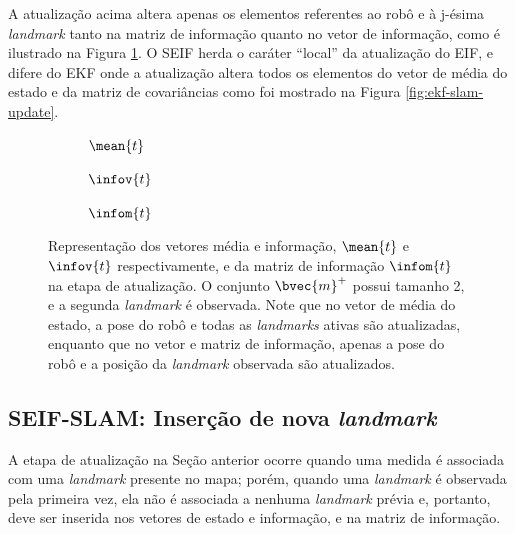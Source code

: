 A atualização acima altera apenas os elementos referentes ao robô e à 
j-ésima \textit{landmark} tanto na matriz de informação quanto no vetor 
de informação, como é ilustrado na Figura \ref{fig:seif-slam-update}. O SEIF 
herda o caráter ``local'' da atualização do EIF, e difere do EKF onde a 
atualização altera todos os elementos do vetor de média do estado e da matriz de 
covariâncias como foi mostrado na Figura \ref{fig:ekf-slam-update}.
\begin{figure}[h]
  \begin{subfigure}{.30\textwidth}
    
    \caption{$\mean{t}$}
  \end{subfigure}
  \hfill
  \begin{subfigure}{.30\textwidth}
    
    \caption{$\infov{t}$}
  \end{subfigure}
  \hfill
  \begin{subfigure}{.3\textwidth}
    
    \caption{$\infom{t}$}
  \end{subfigure}
  \caption[Elementos do vetor média, vetor de informação e da matriz de informação alterados no passo de atualização do Filtro de Informação Estendido Esparso de um sistema SLAM]{Representação dos vetores média e informação, $\mean{t}$ e $\infov{t}$ respectivamente, e da matriz de informação $\infom{t}$ na 
  etapa de atualização. O conjunto $\bvec{m}^+$ possui tamanho 2, e a 
  segunda \textit{landmark} é observada. Note que no vetor de média do estado, 
  a pose do robô e todas as \textit{landmarks} ativas são atualizadas, 
  enquanto que no vetor e matriz de informação, apenas a pose do robô e 
  a posição da \textit{landmark} observada são atualizados.}
  \label{fig:seif-slam-update}
\end{figure}

\subsection{SEIF-SLAM: Inserção de nova \textit{landmark}}
A etapa de atualização na Seção anterior ocorre quando uma medida é 
associada com uma \textit{landmark} presente no mapa; porém, quando 
uma \textit{landmark} é observada pela primeira vez, ela não é 
associada a nenhuma \textit{landmark} prévia e, portanto, deve ser 
inserida nos vetores de estado e informação, e na matriz de informação. 

